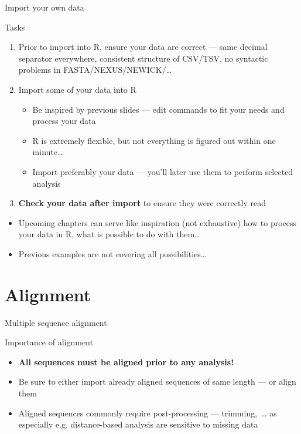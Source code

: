 \documentclass[compress, xelatex, 11pt, xcolor=svgnames, aspectratio=169, url={hyphens, lowtilde}]{beamer}
\begin{document}
\begin{frame}{Import your own data}
	\begin{exampleblock}{Tasks}
		\begin{enumerate}
			\item Prior to import into R, \alert{ensure your data are correct} --- same decimal separator everywhere, consistent structure of CSV/TSV, no syntactic problems in FASTA/NEXUS/NEWICK/\ldots
			\item Import some of your data into R
			\begin{itemize}
				\item Be inspired by previous slides --- edit commands to fit your needs and process your data
				\item R is extremely flexible, but not everything is figured out within one minute\ldots
				\item Import preferably your data --- you'll later use them to perform selected analysis
			\end{itemize}
			\item \textbf{Check your data after import} to ensure they were correctly read
		\end{enumerate}
	\end{exampleblock}
	\begin{itemize}
		\item Upcoming chapters can serve like inspiration (not exhaustive) how to process your data in R, what is possible to do with them\ldots
		\item Previous examples are not covering all possibilities\ldots
	\end{itemize}
\end{frame}

\section{Alignment}

\begin{frame}[fragile]{Multiple sequence alignment}
	\tableofcontents[currentsection, sectionstyle=show/hide, hideothersubsections]
	\begin{alertblock}{Importance of alignment}
		\begin{itemize}
			\item \textbf{All sequences must be aligned prior to any analysis!}
			\item Be sure to either import already aligned sequences of same length --- or align them
			\item Aligned sequences commonly require post-processing --- trimming,~\ldots{ }as especially e.g. distance-based analysis are sensitive to missing data
		\end{itemize}
	\end{alertblock}
\end{frame}
\end{document}
